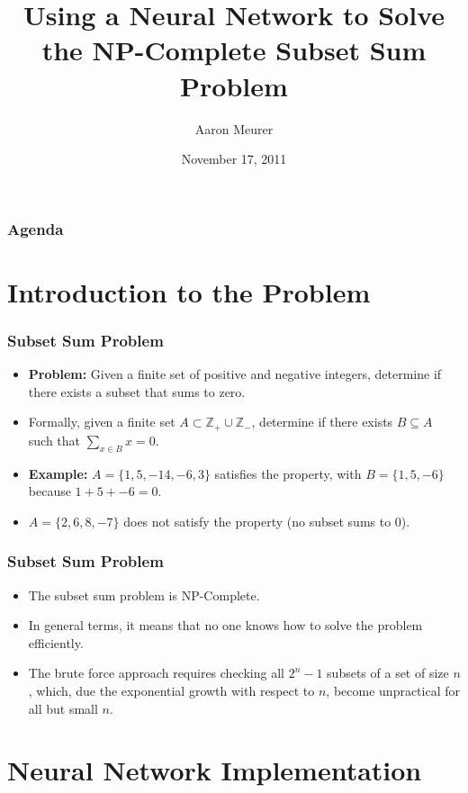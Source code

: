 \documentclass{beamer}
\title{Using a Neural Network to Solve the NP-Complete Subset Sum Problem}
\author{Aaron Meurer}
\date{November 17, 2011}
\numberwithin{equation}{section} %
\begin{document}
\begin{frame}
    \titlepage
\end{frame}

\begin{frame}
    \frametitle{Agenda}
    \tableofcontents
\end{frame}

\section{Introduction to the Problem}

\begin{frame}
    \frametitle{Subset Sum Problem}
    \begin{itemize}
        \item \textbf{Problem:} Given a finite set of positive and negative integers, determine if there exists a subset that sums to zero.
        \pause
        \item Formally, given a finite set $A \subset \mathbb{Z}_+ \cup \mathbb{Z}_-$, determine if there exists $B \subseteq A$ such that $\sum_{x\in B}x = 0$.
        \pause
       \item \textbf{Example:} $A=\{1, 5, -14, -6, 3\}$ satisfies the property, with $B=\{1, 5, -6\}$ because $1 + 5 + -6 = 0$.
       \pause
       \item $A=\{2, 6, 8, -7\}$ does not satisfy the property (no subset sums to 0).
    \end{itemize}
\end{frame}

\begin{frame}
    \frametitle{Subset Sum Problem}
    \begin{itemize}
        \item The subset sum problem is NP-Complete.
        \pause
        \item In general terms, it means that no one knows how to solve the problem efficiently.
        \pause
        \item The brute force approach requires checking all $2^n - 1$ subsets of a set of size $n$, which, due the exponential growth with respect to $n$, become unpractical for all but small $n$.
    \end{itemize}
\end{frame}

\section{Neural Network Implementation}
\end{document}

